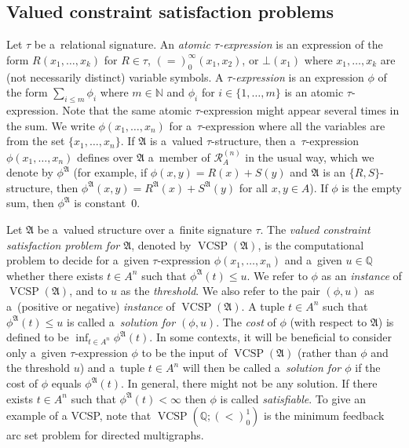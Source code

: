 \documentclass[preprint,12pt]{elsarticle}
\newcommand{\Q}{\mathbb Q}
\newcommand{\bA}{{\mathfrak A}}
\DeclareMathOperator{\VCSP}{VCSP}
\begin{document}
\subsection{Valued constraint satisfaction problems}
Let $\tau$ be a~relational signature. An \emph{atomic \mbox{$\tau$-expression}} is an expression
of the form $R(x_1,\dots,x_k)$ for $R \in \tau$, $(=)_0^\infty(x_1, x_2)$, or $\bot(x_1)$
where  $x_1,\dots,x_k$ are (not necessarily distinct) variable symbols.
A \emph{$\tau$-expression} is an expression $\phi$ 
of the form 
$\sum_{i \leq m} \phi_i$
where $m \in {\mathbb N}$ 
and $\phi_i$ for $i \in \{1,\dots,m\}$ is 
an atomic $\tau$-expression.
Note that the same atomic $\tau$-expression might appear several times in the sum. 
We write $\phi(x_1,\dots,x_n)$ for a~$\tau$-expression where all the variables  
are from the set $\{x_1,\dots,x_n\}$. 
If $\bA$ is a~valued $\tau$-structure, then a~$\tau$-expression $\phi(x_1,\dots,x_n)$ defines over $\bA$ a~member of ${\mathscr R}_A^{(n)}$ in the usual way, which we denote by $\phi^{\bA}$ (for example, if $\phi(x,y)=R(x)+S(y)$ and $\bA$ is an $\{R,S\}$-structure, then $\phi^\bA(x,y) = R^\bA(x)+S^\bA(y)$ for all $x,y\in A$).
If $\phi$ is the empty sum, then $\phi^{\bA}$ is constant~$0$. 


Let $\bA$ be a~valued structure over a~finite signature $\tau$.
The \emph{valued constraint satisfaction problem for $\bA$}, denoted by \emph{$\VCSP(\bA)$}, is the computational
problem to decide for a~given $\tau$-expression $\phi(x_1,\dots,x_n)$ 
and a~given $u \in {\mathbb Q}$
whether there exists
$t \in A^n$ such that $\phi^{\bA}(t) \leq u$. 
We refer to $\phi$ as an \emph{instance} of $\VCSP(\bA)$,
and to $u$ as the \emph{threshold}. We also refer to the pair $(\phi,u)$ as a~(positive or negative) \emph{instance} of $\VCSP(\bA)$.
A tuple $t \in A^n$ such that $\phi^{\bA}(t) \leq u$ is called a~\emph{solution for $(\phi,u)$}.
The \emph{cost}  of $\phi$ (with respect to $\bA$) is defined to be
$\inf_{t \in A^n} \phi^{\bA}(t).$
In some contexts, it will be beneficial to consider only a~given $\tau$-expression $\phi$ to be the input of $\VCSP(\bA)$ (rather than $\phi$ and the threshold $u$) and a~tuple $t \in A^n$ will then be called a~\emph{solution for $\phi$} if the cost of $\phi$ equals $\phi^{\bA}(t)$. In general, there might not be any solution. 
If there exists $t \in A^n$ such that $\phi^{\bA}(t) < \infty$ then $\phi$ is called \emph{satisfiable}. 
To give an example of a VCSP, note that $\VCSP(\Q; (<)_0^1)$ is the minimum feedback arc set problem for directed multigraphs.
%
\end{document}
